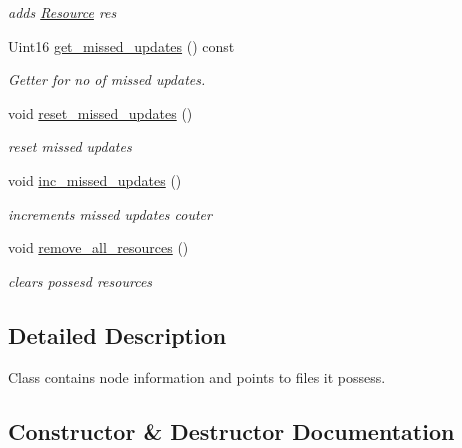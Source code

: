 \begin{DoxyCompactItemize}
\begin{DoxyCompactList}\small\item\em adds \hyperlink{classsimpleP2P_1_1Resource}{Resource} res \end{DoxyCompactList}\item 
Uint16 \hyperlink{classsimpleP2P_1_1Host_a408c8c8ddcc1f6d9ee966ec73fe812d3}{get\+\_\+missed\+\_\+updates} () const
\begin{DoxyCompactList}\small\item\em Getter for no of missed updates. \end{DoxyCompactList}\item 
\mbox{\label{classsimpleP2P_1_1Host_a7dd6ef8ea2767b27f583bf4b43bc7d84}} 
void \hyperlink{classsimpleP2P_1_1Host_a7dd6ef8ea2767b27f583bf4b43bc7d84}{reset\+\_\+missed\+\_\+updates} ()
\begin{DoxyCompactList}\small\item\em reset missed updates \end{DoxyCompactList}\item 
\mbox{\label{classsimpleP2P_1_1Host_a6e6e0445e505ffcf0ca6f206bcafc2b1}} 
void \hyperlink{classsimpleP2P_1_1Host_a6e6e0445e505ffcf0ca6f206bcafc2b1}{inc\+\_\+missed\+\_\+updates} ()
\begin{DoxyCompactList}\small\item\em increments missed updates couter \end{DoxyCompactList}\item 
\mbox{\label{classsimpleP2P_1_1Host_aaf16af8d445d6a9e7d14e80e5b8ec941}} 
void \hyperlink{classsimpleP2P_1_1Host_aaf16af8d445d6a9e7d14e80e5b8ec941}{remove\+\_\+all\+\_\+resources} ()
\begin{DoxyCompactList}\small\item\em clears possesd resources \end{DoxyCompactList}\end{DoxyCompactItemize}


\subsection{Detailed Description}
Class contains node information and points to files it possess. 

\subsection{Constructor \& Destructor Documentation}
\mbox{\label{classsimpleP2P_1_1Host_abbe0b5c51195b8cf2019d791ace5a5c7}} 
